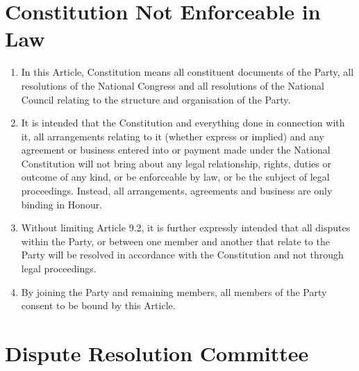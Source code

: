 \documentclass[a4paper,titlepage,8.5pt]{article}
\begin{document}
\section{Constitution Not Enforceable in Law}

\begin{enumerate}
\item In this Article, Constitution means all constituent documents of the Party, all resolutions of the National Congress and all resolutions of the National Council relating to the structure and organisation of the Party.
\item It is intended that the Constitution and everything done in connection with it, all arrangements relating to it (whether express or implied) and any agreement or business entered into or payment made under the National Constitution will not bring about any legal relationship, rights, duties or outcome of any kind, or be enforceable by law, or be the subject of legal proceedings. Instead, all arrangements, agreements and business are only binding in Honour.
\item Without limiting Article 9.2, it is further expressly intended that all disputes within the Party, or between one member and another that relate to the Party will be resolved in accordance with the Constitution and not through legal proceedings.
\item By joining the Party and remaining members, all members of the Party consent to be bound by this Article.
\end{enumerate}

\section{Dispute Resolution Committee}
 
\end{document}

